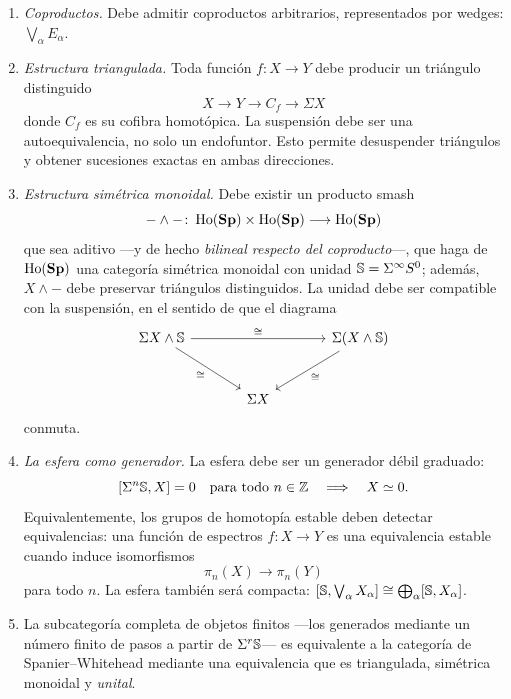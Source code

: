 \begin{enumerate}
\item\emph{Coproductos.} Debe admitir coproductos arbitrarios, representados por wedges: $\bigvee_{\alpha}E_\alpha$.

\item\emph{Estructura triangulada.} Toda función \(f\colon X\to Y\) debe producir un triángulo distinguido
\[
X\longrightarrow Y\longrightarrow C_f\longrightarrow\Sigma X
\]
donde \(C_f\) es su cofibra homotópica. La suspensión debe ser una autoequivalencia, no solo un endofuntor. Esto permite desuspender triángulos y obtener sucesiones exactas en ambas direcciones.

\item\emph{Estructura simétrica monoidal.} Debe existir un producto smash
\[
-\wedge-\colon\operatorname{Ho}(\mathbf{Sp})\times\operatorname{Ho}(\mathbf{Sp})\longrightarrow\operatorname{Ho}(\mathbf{Sp})
\]
que sea aditivo ---y de hecho \emph{bilineal respecto del coproducto}---, que haga de $\operatorname{Ho}(\mathbf{Sp})$ una categoría simétrica monoidal con unidad $\mathbb{S}=\Sigma^\infty S^0$; además, \(X\wedge-\) debe preservar triángulos distinguidos. La unidad debe ser compatible con la suspensión, en el sentido de que el diagrama
\[
\begin{tikzcd}[column sep=large, row sep=large]
\Sigma X\wedge\Sph \arrow[rr,"\cong"] \arrow[dr,"\cong"'] & & \Sigma(X\wedge\Sph) \arrow[dl,"\cong"]\\
& \Sigma X &
\end{tikzcd}
\]
conmuta.

\item\emph{La esfera como generador.} La esfera debe ser un generador débil graduado:
\[
[\Sigma^n\mathbb{S},X]=0\quad\text{para todo }n\in\mathbb Z\quad\Longrightarrow\quad X\simeq0.
\]
Equivalentemente, los grupos de homotopía estable deben detectar equivalencias: una función de espectros \(f\colon X\to Y\) es una equivalencia estable cuando induce isomorfismos
\[
\pi_n(X)\longrightarrow\pi_n(Y)
\]
 para todo \(n\). La esfera también será compacta: $[\mathbb{S},\bigvee_\alpha X_\alpha]\cong\bigoplus_\alpha[\mathbb{S},X_\alpha]$.

\item La subcategoría completa de objetos finitos ---los generados mediante un número finito de pasos a partir de \(\Sigma^r\mathbb{S}\)--- es equivalente a la categoría de Spanier--Whitehead mediante una equivalencia que es triangulada, simétrica monoidal y \emph{unital}.
\end{enumerate}


